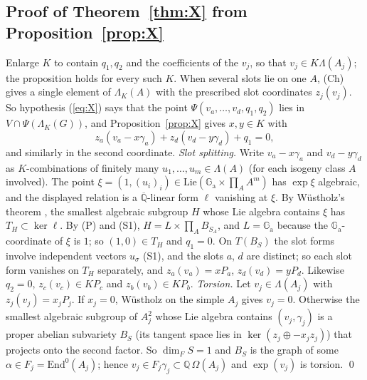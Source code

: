 \documentclass[11pt]{amsart}
\theoremstyle{definition}
\newcommand{\Qb}{\overline{\mathbb{Q}}}
\newcommand{\Q}{\mathbb{Q}}
\newcommand{\Ga}{\mathbb{G}_{\mathrm a}}
\begin{document}
\subsection{Proof of Theorem~\ref{thm:X} from Proposition~\ref{prop:X}}\label{sec:XfromP}
Enlarge $K$ to contain $q_1,q_2$ and the coefficients of the $v_j$, so that $v_j\in K\Lambda(A_j)$; the proposition holds
for every such $K$. When several slots lie on one $A$, (Ch) gives a single element of $\Lambda_K(A)$ with the prescribed slot
coordinates $z_j(v_j)$. So hypothesis (\ref{eq:X}) says that the point $\Psi(v_a,\dots,v_d,q_1,q_2)$ lies in
$V\cap\Psi(\Lambda_K(G))$, and Proposition~\ref{prop:X} gives $x,y\in K$ with
\[
z_a(v_a-x\gamma_a)+z_d(v_d-y\gamma_d)+q_1=0,
\]
and similarly in the second coordinate. \emph{Slot splitting.} Write $v_a-x\gamma_a$ and $v_d-y\gamma_d$ as
$K$-combinations of finitely many $u_1,\dots,u_m\in\Lambda(A)$ (for each isogeny class $A$ involved). The point
$\xi=(1,(u_i)_i)\in\mathrm{Lie}(\Ga\times\prod_AA^{m})$ has $\exp\xi$ algebraic, and the displayed relation is a $\Qb$-linear
form $\ell$ vanishing at $\xi$. By W\"ustholz's theorem \cite{Wu89}, the smallest algebraic subgroup $H$ whose Lie algebra
contains $\xi$ has $T_H\subset\ker\ell$. By (P) and (S1), $H=L\times\prod_AB_{S_A}$, and $L=\Ga$ because the $\Ga$-coordinate of $\xi$
is $1$; so $(1,0)\in T_H$ and $q_1=0$. On $T(B_S)$ the slot forms involve independent vectors $u_\sigma$ (S1), and the
slots $a$, $d$ are distinct; so each slot form vanishes on $T_H$ separately, and $z_a(v_a)=xP_a$, $z_d(v_d)=yP_d$.
Likewise $q_2=0$, $z_c(v_c)\in KP_c$ and $z_b(v_b)\in KP_b$. \emph{Torsion.} Let $v_j\in\Lambda(A_j)$ with
$z_j(v_j)=x_jP_j$. If $x_j=0$, W\"ustholz on the simple $A_j$ gives $v_j=0$. Otherwise the smallest algebraic subgroup of
$A_j^2$ whose Lie algebra contains $(v_j,\gamma_j)$ is a proper abelian subvariety $B_S$ (its tangent space lies in
$\ker(z_j\oplus-x_jz_j)$) that projects onto the second factor. So $\dim_FS=1$ and $B_S$ is the graph of some
$\alpha\in F_j=\mathrm{End}^0(A_j)$; hence $v_j\in F_j\gamma_j\subset\Q\,\Omega(A_j)$ and $\exp(v_j)$ is torsion. \qed
\end{document}
